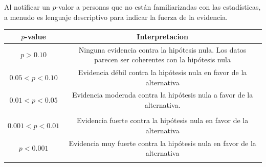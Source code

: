 \documentclass[]{article}
\numberwithin{equation}{section}
\begin{document}
Al notificar un \(p\)-valor a personas que no están familiarizadas con
las estadísticas, a menudo es lenguaje descriptivo para indicar la
fuerza de la evidencia.

\begin{longtable}[]{@{}cc@{}}
\toprule
\begin{minipage}[b]{0.14\columnwidth}\centering\strut
\(p\)-value\strut
\end{minipage} & \begin{minipage}[b]{0.80\columnwidth}\centering\strut
Interpretacion\strut
\end{minipage}\tabularnewline
\midrule
\endhead
\begin{minipage}[t]{0.14\columnwidth}\centering\strut
\(p> 0.10\)\strut
\end{minipage} & \begin{minipage}[t]{0.80\columnwidth}\centering\strut
Ninguna evidencia contra la hipótesis nula. Los datos parecen ser
coherentes con la hipótesis nula\strut
\end{minipage}\tabularnewline
\begin{minipage}[t]{0.14\columnwidth}\centering\strut
\(0.05<p<0.10\)\strut
\end{minipage} & \begin{minipage}[t]{0.80\columnwidth}\centering\strut
Evidencia débil contra la hipótesis nula en favor de la
alternativa\strut
\end{minipage}\tabularnewline
\begin{minipage}[t]{0.14\columnwidth}\centering\strut
\(0.01<p<0.05\)\strut
\end{minipage} & \begin{minipage}[t]{0.80\columnwidth}\centering\strut
Evidencia moderada contra la hipótesis nula a favor de la
alternativa.\strut
\end{minipage}\tabularnewline
\begin{minipage}[t]{0.14\columnwidth}\centering\strut
\strut
\end{minipage}\tabularnewline
\begin{minipage}[t]{0.14\columnwidth}\centering\strut
\(0.001<p<0.01\)\strut
\end{minipage} & \begin{minipage}[t]{0.80\columnwidth}\centering\strut
Evidencia fuerte contra la hipótesis nula en favor de la
alternativa\strut
\end{minipage}\tabularnewline
\begin{minipage}[t]{0.14\columnwidth}\centering\strut
\(p<0.001\)\strut
\end{minipage} & \begin{minipage}[t]{0.80\columnwidth}\centering\strut
Evidencia muy fuerte contra la hipótesis nula en favor de la
alternativa\strut
\end{minipage}\tabularnewline
\begin{minipage}[t]{0.14\columnwidth}\centering\strut
\strut
\end{minipage}\tabularnewline
\bottomrule
\end{longtable}
\end{document}
